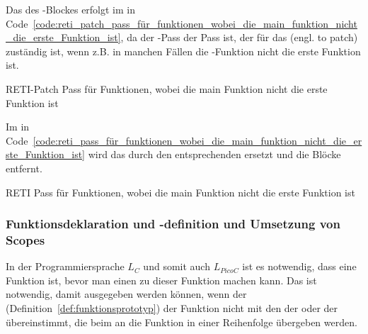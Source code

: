 Das  des -Blockes erfolgt im  in Code~\ref{code:reti_patch_pass_für_funktionen_wobei_die_main_funktion_nicht_die_erste_Funktion_ist}, da der -Pass der Pass ist, der für das  (engl. to patch) zuständig ist, wenn z.B. in manchen Fällen die -Funktion nicht die erste Funktion ist.

\begin{code}
  \centering
  \caption{RETI-Patch Pass für Funktionen, wobei die main Funktion nicht die erste Funktion ist}
  \label{code:reti_patch_pass_für_funktionen_wobei_die_main_funktion_nicht_die_erste_Funktion_ist}
\end{code}

Im  in Code~\ref{code:reti_pass_für_funktionen_wobei_die_main_funktion_nicht_die_erste_Funktion_ist} wird das  durch den entsprechenden   ersetzt und die Blöcke entfernt.

\begin{code}
  \centering
  \caption{RETI Pass für Funktionen, wobei die main Funktion nicht die erste Funktion ist}
  \label{code:reti_pass_für_funktionen_wobei_die_main_funktion_nicht_die_erste_Funktion_ist}
\end{code}

\subsubsection{Funktionsdeklaration und -definition und Umsetzung von Scopes}

In der Programmiersprache $L_C$ und somit auch $L_{PicoC}$ ist es notwendig, dass eine Funktion  ist, bevor man einen  zu dieser Funktion machen kann. Das ist notwendig, damit  ausgegeben werden können, wenn der  (Definition~\ref{def:funktionsprototyp}) der Funktion nicht mit den  der  oder der   übereinstimmt, die beim  an die Funktion in einer  Reihenfolge übergeben werden.


